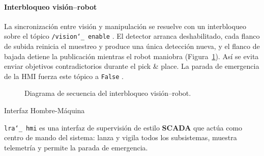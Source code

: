 \documentclass[12pt,a4paper]{article}
\makeatletter
\newcommand{\subsecfmt}[1]{%
  {\large\bfseries\color{MediumBlue}#1}%
  \par\vspace{2pt}%
}
\renewcommand\subsection{%
  \@ifstar\subsection@star\subsection@nostar
}
\newcommand\subsection@nostar[1]{%
  \refstepcounter{subsection}%
  \addcontentsline{toc}{subsection}{\protect\numberline{\thesubsection}#1}%
  \vspace{10pt}%
  \subsecfmt{\thesubsection.\enspace #1}%
  \vspace{2pt}%
}
\newcommand\subsection@star[1]{%
  \vspace{10pt}\subsecfmt{#1}\vspace{2pt}%
}
\newcommand{\code}[1]{%
  \begingroup
  \def\_{\char`_\penalty0 }%
  \def\/{\char`/\penalty0 }%
  \texttt{\small #1}%
  \endgroup}
\makeatother
\begin{document}
\paragraph{Interbloqueo visión--robot}
\label{sec:interlock}

La sincronización entre visión y manipulación se resuelve con un
interbloqueo sobre el tópico \code{/vision\_enable}. El detector arranca deshabilitado, cada flanco de
subida reinicia el muestreo y produce una única detección nueva, y el
flanco de bajada detiene la publicación mientras el robot maniobra
(Figura~\ref{fig:interlock}). Así se evita enviar objetivos contradictorios
durante el pick \& place. La parada de emergencia de la HMI fuerza este
tópico a \code{False}.

\begin{figure}[H]
\centering
{}
\caption{Diagrama de secuencia del interbloqueo visión--robot.}
\label{fig:interlock}
\end{figure}

\clearpage
\subsection{Interfaz Hombre-Máquina}
\label{sec:hmi}

\code{lra\_hmi} es una interfaz de
supervisión de estilo \textbf{SCADA} que actúa como centro de mando del
sistema: lanza y vigila todos los subsistemas, muestra telemetría y permite la
parada de emergencia.
\end{document}
